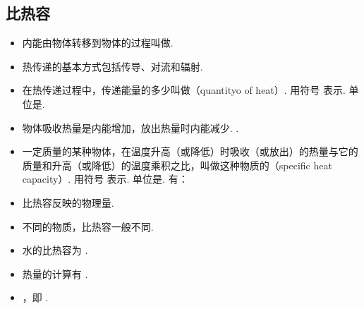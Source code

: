 \newpage
\subsection{比热容}
\vspace{10pt}
\begin{itemize}
\item 内能由物体转移到物体的过程叫做.
\item 热传递的基本方式包括传导、对流和辐射.
\item 在热传递过程中，传递能量的多少叫做（quantityo of heat）. 用符号  表示. 单位是. 
\item 物体吸收热量是内能增加，放出热量时内能减少. .
\item 一定质量的某种物体，在温度升高（或降低）时吸收（或放出）的热量与它的质量和升高（或降低）的温度乘积之比，叫做这种物质的（specific heat capacity）. 用符号  表示. 单位是. 有：
\item 比热容反映的物理量.
\item 不同的物质，比热容一般不同.
\item 水的比热容为 .
\item 热量的计算有 .
\item {}，即 .
\end{itemize}